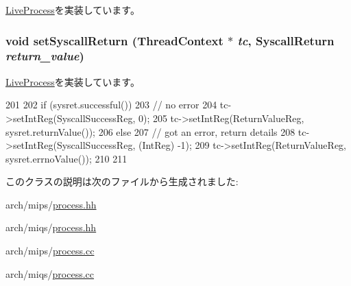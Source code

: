 \hyperlink{classLiveProcess_a5955e790542b86589b9fd75df24ec2d3}{LiveProcess}を実装しています。\hypertarget{classMipsLiveProcess_aaefd02663c1eae206b851290d9276a5e}{
\subsubsection[{setSyscallReturn}]{\setlength{\rightskip}{0pt plus 5cm}void setSyscallReturn ({\bf ThreadContext} $\ast$ {\em tc}, \/  {\bf SyscallReturn} {\em return\_\-value})}}
\label{classMipsLiveProcess_aaefd02663c1eae206b851290d9276a5e}


\hyperlink{classLiveProcess_a5955e790542b86589b9fd75df24ec2d3}{LiveProcess}を実装しています。


\begin{DoxyCode}
201 {
202     if (sysret.successful()) {
203         // no error
204         tc->setIntReg(SyscallSuccessReg, 0);
205         tc->setIntReg(ReturnValueReg, sysret.returnValue());
206     } else {
207         // got an error, return details
208         tc->setIntReg(SyscallSuccessReg, (IntReg) -1);
209         tc->setIntReg(ReturnValueReg, sysret.errnoValue());
210     }
211 }
\end{DoxyCode}


このクラスの説明は次のファイルから生成されました:\begin{DoxyCompactItemize}
\item 
arch/mips/\hyperlink{arch_2mips_2process_8hh}{process.hh}\item 
arch/miqs/\hyperlink{arch_2miqs_2process_8hh}{process.hh}\item 
arch/mips/\hyperlink{arch_2mips_2process_8cc}{process.cc}\item 
arch/miqs/\hyperlink{arch_2miqs_2process_8cc}{process.cc}\end{DoxyCompactItemize}
